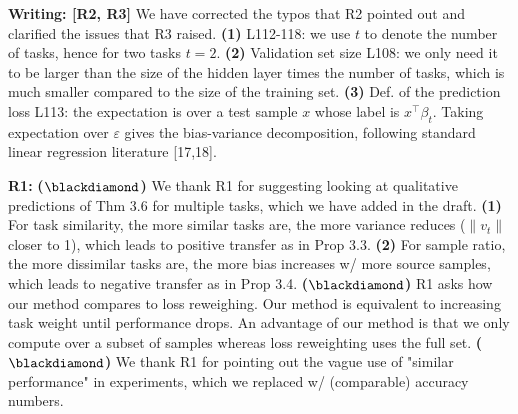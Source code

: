 \documentclass{article}
\begin{document}
\vspace{-0.025in}
\textbf{Writing: [R2, R3]}
We have corrected the typos that R2 pointed out and clarified the issues that R3 raised.
\textbf{(1)} L112-118: we use $t$ to denote the number of tasks, hence for two tasks $t = 2$.
\textbf{(2)} Validation set size L108: we only need it to be larger than the size of the hidden layer times the number of tasks, which is much smaller compared to the size of the training set.
\textbf{(3)} Def. of the prediction loss L113: the expectation is over a test sample $x$ whose label is $x^{\top}\beta_t$.
Taking expectation over $\varepsilon$ gives  the bias-variance decomposition, following standard linear regression literature [17,18].

\vspace{-0.025in}
\textbf{R1:}
\textbf{($\blackdiamond$)} We thank R1 for suggesting looking at qualitative predictions of Thm 3.6 for multiple tasks, which we have added in the  draft.
\textbf{(1)} For task similarity, the more similar tasks are, the more variance reduces ($\|{v_t}\|$ closer to 1), which leads to positive transfer as in Prop 3.3.
\textbf{(2)} For sample ratio, the more dissimilar tasks are, the more bias increases w/ more source samples, which leads to negative transfer as in Prop 3.4.
\textbf{($\blackdiamond$)} R1 asks how our method compares to loss reweighing.
Our method is equivalent to increasing task weight until performance drops.
An advantage of our method is that we only compute over a subset of samples whereas loss reweighting uses the full set.
\textbf{($\blackdiamond$)} We thank R1 for pointing out the vague use of "similar performance" in experiments, which we replaced w/ (comparable) accuracy numbers. %
\end{document}
